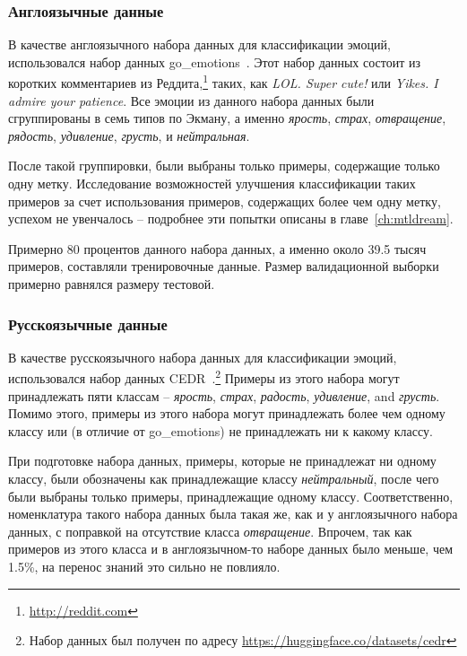 \subsubsection{Англоязычные данные}
В качестве англоязычного набора данных для классификации эмоций, использовался набор данных {go\_emotions}~\cite{go_emotions}. Этот набор данных состоит из коротких комментариев из Реддита,\footnote{\url{http://reddit.com}} таких, как \textit{LOL. Super cute!} или \textit{Yikes. I admire your patience}. Все эмоции из данного набора данных были сгруппированы в семь типов по Экману, а именно \textit{ярость}, \textit{страх}, \textit{отвращение}, \textit{рядость}, \textit{удивление}, \textit{грусть}, и \textit{нейтральная}.

После такой группировки, были выбраны только примеры, содержащие только одну метку. Исследование возможностей улучшения классификации таких примеров за счет использования примеров, содержащих более чем одну метку, успехом не увенчалось -- подробнее эти попытки описаны в главе~\ref{ch:mtldream}. 

Примерно 80 процентов данного набора данных, а именно около 39.5 тысяч примеров, составляли тренировочные данные. Размер валидационной выборки примерно равнялся размеру тестовой. 

\subsubsection{Русскоязычные данные}
В качестве русскоязычного набора данных для классификации эмоций, использовался набор данных {CEDR}~\cite{ru_emotions}.\footnote{Набор данных был получен по адресу \url{https://huggingface.co/datasets/cedr}} Примеры из этого набора могут принадлежать пяти классам -- \textit{ярость}, \textit{страх}, \textit{радость}, \textit{удивление}, and \textit{грусть}. Помимо этого, примеры из этого набора могут принадлежать более чем одному классу или (в отличие от {go\_emotions}) не принадлежать ни к какому классу.

При подготовке набора данных, примеры, которые не принадлежат ни одному классу, были обозначены как принадлежащие классу \textit{нейтральный}, после чего были выбраны только примеры, принадлежащие одному классу. Соответственно, номенклатура такого набора данных была такая же, как и у англоязычного набора данных, с поправкой на отсутствие класса \textit{отвращение}. Впрочем, так как примеров из этого класса и в англоязычном-то наборе данных было меньше, чем 1.5\%, на перенос знаний это сильно не повлияло. 

